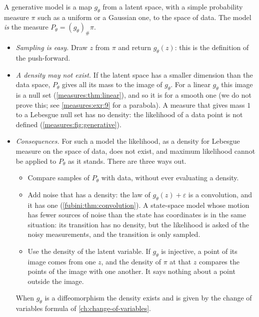 \begin{notechapter}
\begin{mlthread}
A generative model is a map $g_\theta$ from a latent space, with a
simple probability measure $\pi$ such as a uniform or a Gaussian one, to
the space of data. The model \emph{is} the measure
$P_\theta = (g_\theta)_\#\pi$.
\begin{itemize}[nosep]
  \item \emph{Sampling is easy.} Draw $z$ from $\pi$ and return
        $g_\theta(z)$: this is the definition of the push-forward.
  \item \emph{A density may not exist.} If the latent space has a
        smaller dimension than the data space, $P_\theta$ gives all its
        mass to the image of $g_\theta$. For a linear $g_\theta$ this
        image is a null set (\cref{measures:thm:linear}), and so it is
        for a smooth one (we do not prove this; see
        \cref{measures:exr:9} for a parabola). A measure that gives mass
        $1$ to a Lebesgue null set has no density: the likelihood of a
        data point is not defined
        (\cref{measures:fig:generative}).
  \item \emph{Consequences.} For such a model the likelihood, as a
        density for Lebesgue measure on the space of data, does not
        exist, and maximum likelihood cannot be applied to $P_\theta$
        as it stands. There are three ways out.
        \begin{itemize}[nosep]
          \item Compare samples of $P_\theta$ with data, without ever
                evaluating a density.
          \item Add noise that has a density: the law of
                $g_\theta(z) + \varepsilon$ is a convolution, and it
                has one (\cref{fubini:thm:convolution}). A state-space
                model whose motion has fewer sources of noise than the
                state has coordinates is in the same situation: its
                transition has no density, but the likelihood is asked
                of the noisy measurements, and the transition is only
                sampled.
          \item Use the density of the latent variable. If $g_\theta$
                is injective, a point of its image comes from one $z$,
                and the density of $\pi$ at that $z$ compares the
                points of the image with one another. It says nothing
                about a point outside the image.
        \end{itemize}
        When $g_\theta$ is a diffeomorphism the density exists and is
        given by the change of variables formula of
        \cref{ch:change-of-variables}.
\end{itemize}
\end{mlthread}


\end{notechapter}

